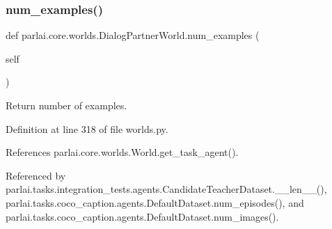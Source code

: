 \subsubsection{\texorpdfstring{num\+\_\+examples()}{num\_examples()}}
{\footnotesize\ttfamily def parlai.\+core.\+worlds.\+Dialog\+Partner\+World.\+num\+\_\+examples (\begin{DoxyParamCaption}\item[{}]{self }\end{DoxyParamCaption})}

\begin{DoxyVerb}Return number of examples.\end{DoxyVerb}
 

Definition at line 318 of file worlds.\+py.



References parlai.\+core.\+worlds.\+World.\+get\+\_\+task\+\_\+agent().



Referenced by parlai.\+tasks.\+integration\+\_\+tests.\+agents.\+Candidate\+Teacher\+Dataset.\+\_\+\+\_\+len\+\_\+\+\_\+(), parlai.\+tasks.\+coco\+\_\+caption.\+agents.\+Default\+Dataset.\+num\+\_\+episodes(), and parlai.\+tasks.\+coco\+\_\+caption.\+agents.\+Default\+Dataset.\+num\+\_\+images().

